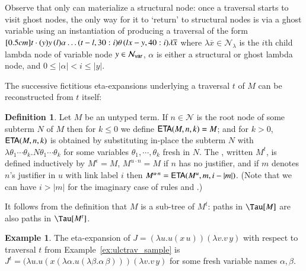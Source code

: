 \documentclass{elsarticle}
\theoremstyle{plain}
\theoremstyle{definition}
\newtheorem{definition}{Definition}[section]
\newtheorem{example}{Example}[section]
\newcommand\Nodes{\mathcal{N}}%
\newcommand\NodesVar{\Nodes_{\sf var}}%
\newcommand\NodesLmd{\Nodes_\lambda}%
\newcommand{\ghostvar}{\theta}
\newcommand{\ctree}{\Tau} %
\begin{document}
Observe that only  can materialize a structural node: once a traversal starts to visit ghost nodes, the only way for it to `return'  to structural nodes is via a ghost variable using an instantiation of  producing a traversal of the form
$
\Pstr[0.5cm]{ t \cdot (y){y} \, (l){\alpha}  \ldots (t-l,30:i){\ghostvar}
    \, (lx-y,40:i){\lambda \overline{x}}}
$
where
 $\lambda \overline{x} \in \NodesLmd$ is the $i$th child lambda node of variable node $y \in \NodesVar$,
$\alpha$ is either a structural or ghost lambda node, and
 $0\leq |\alpha| < i \leq |y|$.


The successive fictitious eta-expansions underlying a traversal $t$ of $M$ can be reconstructed from $t$ itself:
\begin{definition}
\label{def:onthefly_etaexpansion}
Let $M$ be an untyped term. If $n\in \Nodes$ is the root node of some subterm $N$ of $M$ then
for $k \leq 0$ we define ${\sf ETA}(M, n, k) = M$; and for $k> 0$,
 ${\sf ETA}(M, n, k)$ is obtained by substituting in-place the subterm $N$ with $\lambda\theta_1 \cdots \theta_k. N \theta_1 \cdots \theta_k$ for some variables $\theta_1, \cdots, \theta_k$ fresh in $N$.
%
The , written $M^t$, is defined inductively by $M^\epsilon = M$,
$M^{u \cdot n} = M$ if $n$ has no justifier, and if $m$ denotes $n$'s justifier in $u$ with link label $i$ then $M^{u \cdot n} = {\sf ETA}(M^{u}, m, i-|m|)$.
%
(Note that we can have $i>|m|$ for the imaginary case of rules  and .)
\end{definition}
It follows from the definition that $M$ is a sub-tree of $M^t$: paths in $\ctree[M]$ are also paths in $\ctree[M^t]$.

\begin{example}
The eta-expansion of $J = (\lambda u . u(x\,u)) (\lambda v . v\,y)$ with respect to traversal $t$ from Example~\ref{ex:ulctrav_sample} is
$J^t = (\lambda u . u(x (\lambda \alpha. u (\lambda \beta.\alpha\,\beta))) (\lambda v . v\,y)$
for some fresh variable names $\alpha, \beta$.
\end{example}
\end{document}
